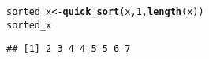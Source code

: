 \documentclass[11pt, a4paper]{article}\usepackage[]{graphicx}\usepackage[]{xcolor}
\makeatletter
\newcommand{\hlnum}[1]{\textcolor[rgb]{0.686,0.059,0.569}{#1}}%
\newcommand{\hldef}[1]{\textcolor[rgb]{0.345,0.345,0.345}{#1}}%
\newcommand{\hlkwb}[1]{\textcolor[rgb]{0.69,0.353,0.396}{#1}}%
\newcommand{\hlkwd}[1]{\textcolor[rgb]{0.737,0.353,0.396}{\textbf{#1}}}%
\newenvironment{kframe}{%
 \def\at@end@of@kframe{}%
 \ifinner\ifhmode%
  \def\at@end@of@kframe{\end{minipage}}%
  \begin{minipage}{\columnwidth}%
 \fi\fi%
 \def\FrameCommand##1{\hskip\@totalleftmargin \hskip-\fboxsep
 \colorbox{shadecolor}{##1}\hskip-\fboxsep
     \hskip-\linewidth \hskip-\@totalleftmargin \hskip\columnwidth}%
 \MakeFramed {\advance\hsize-\width
   \@totalleftmargin\z@ \linewidth\hsize
   \@setminipage}}%
 {\par\unskip\endMakeFramed%
 \at@end@of@kframe}
\newenvironment{knitrout}{}{} %
\makeatother
\begin{document}
\begin{knitrout}
\color{fgcolor}\begin{kframe}
\begin{alltt}
\hldef{sorted_x} \hlkwb{<-} \hlkwd{quick_sort}\hldef{(x,} \hlnum{1}\hldef{,} \hlkwd{length}\hldef{(x))}
\hldef{sorted_x}
\end{alltt}
\begin{verbatim}
## [1] 2 3 4 4 5 5 6 7
\end{verbatim}
\end{kframe}
\end{knitrout}
\end{document}
